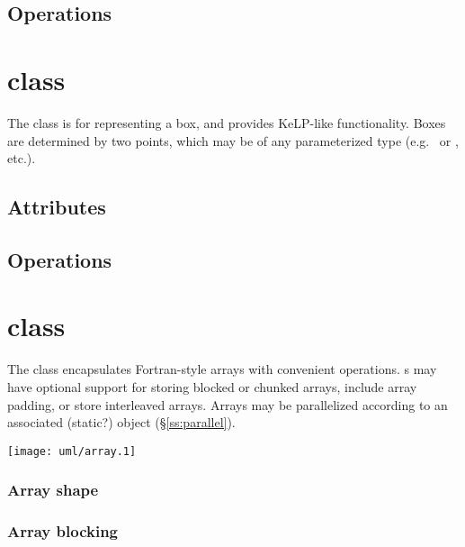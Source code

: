 \subsection{Operations}

\section{ class}

The  class is for representing a box, and provides KeLP-like functionality.
Boxes are determined by two points, which may be of any parameterized type
(e.g.~ or , etc.).


\subsection{Attributes}

\subsection{Operations}

\section{ class}

The  class encapsulates Fortran-style arrays with
convenient operations.  s may have optional support for
storing blocked or chunked arrays, include array padding, or store
interleaved arrays.  Arrays may be parallelized according to an
associated (static?)  object (\S\ref{ss:parallel}).



\centerline{\texttt{[image: uml/array.1]}}

\subsubsection{Array shape}

\subsubsection{Array blocking}

